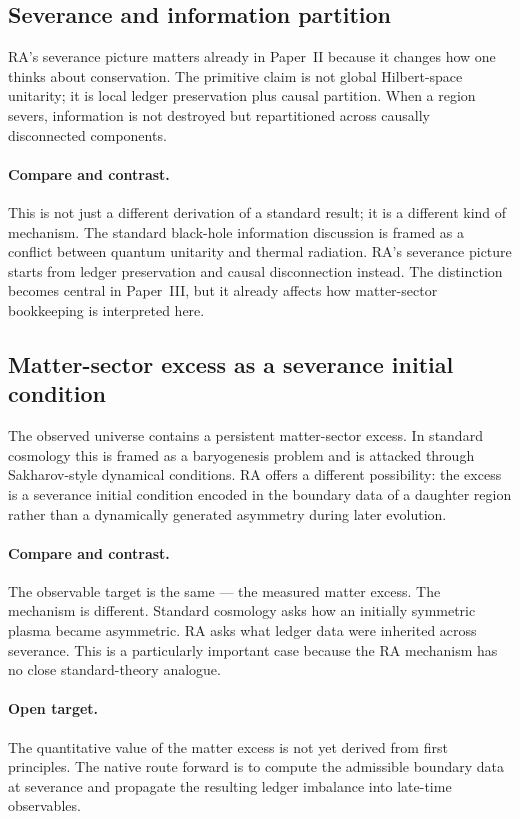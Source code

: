 \documentclass[11pt]{article}
\begin{document}
\subsection{Severance and information partition}

RA's severance picture matters already in Paper~II because it changes how one thinks about conservation. The primitive claim is not global Hilbert-space unitarity; it is local ledger preservation plus causal partition. When a region severs, information is not destroyed but repartitioned across causally disconnected components.

\paragraph{Compare and contrast.} This is not just a different derivation of a standard result; it is a different kind of mechanism. The standard black-hole information discussion is framed as a conflict between quantum unitarity and thermal radiation. RA's severance picture starts from ledger preservation and causal disconnection instead. The distinction becomes central in Paper~III, but it already affects how matter-sector bookkeeping is interpreted here.

\subsection{Matter-sector excess as a severance initial condition}

The observed universe contains a persistent matter-sector excess. In standard cosmology this is framed as a baryogenesis problem and is attacked through Sakharov-style dynamical conditions. RA offers a different possibility: the excess is a severance initial condition encoded in the boundary data of a daughter region rather than a dynamically generated asymmetry during later evolution.

\paragraph{Compare and contrast.} The observable target is the same --- the measured matter excess. The mechanism is different. Standard cosmology asks how an initially symmetric plasma became asymmetric. RA asks what ledger data were inherited across severance. This is a particularly important case because the RA mechanism has no close standard-theory analogue.

\paragraph{Open target.} The quantitative value of the matter excess is not yet derived from first principles. The native route forward is to compute the admissible boundary data at severance and propagate the resulting ledger imbalance into late-time observables.
\end{document}
